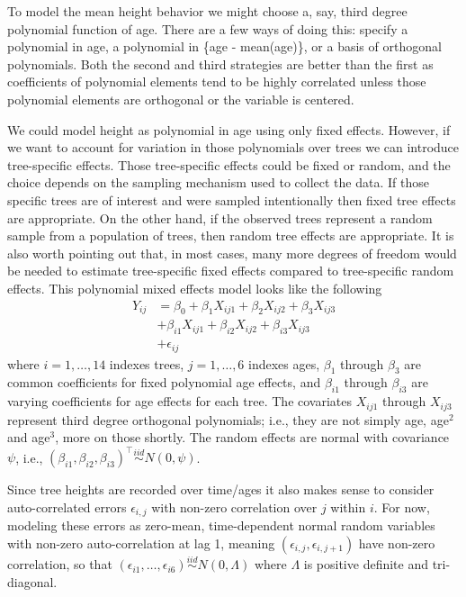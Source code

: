 \documentclass[
]{book}
\begin{document}
To model the mean height behavior we might choose a, say, third degree polynomial function of age. There are a few ways of doing this: specify a polynomial in age, a polynomial in \{age - mean(age)\}, or a basis of orthogonal polynomials. Both the second and third strategies are better than the first as coefficients of polynomial elements tend to be highly correlated unless those polynomial elements are orthogonal or the variable is centered.

We could model height as polynomial in age using only fixed effects. However, if we want to account for variation in those polynomials over trees we can introduce tree-specific effects. Those tree-specific effects could be fixed or random, and the choice depends on the sampling mechanism used to collect the data. If those specific trees are of interest and were sampled intentionally then fixed tree effects are appropriate. On the other hand, if the observed trees represent a random sample from a population of trees, then random tree effects are appropriate. It is also worth pointing out that, in most cases, many more degrees of freedom would be needed to estimate tree-specific fixed effects compared to tree-specific random effects. This polynomial mixed effects model looks like the following
\begin{align*}
Y_{ij} &= \beta_0 + \beta_1 X_{ij1}+ \beta_2 X_{ij2}+ \beta_3 X_{ij3}\\
       &+ \beta_{i1} X_{ij1}+ \beta_{i2} X_{ij2}+ \beta_{i3} X_{ij3}\\
       & + \epsilon_{ij}
\end{align*}
where \(i=1, \ldots, 14\) indexes trees, \(j = 1, \ldots, 6\) indexes ages, \(\beta_1\) through \(\beta_3\) are common coefficients for fixed polynomial age effects, and \(\beta_{i1}\) through \(\beta_{i3}\) are varying coefficients for age effects for each tree. The covariates \(X_{ij1}\) through \(X_{ij3}\) represent third degree orthogonal polynomials; i.e., they are not simply age, age\(^2\) and age\(^3\), more on those shortly. The random effects are normal with covariance \(\psi\), i.e., \((\beta_{i1},\beta_{i2},\beta_{i3})^\top \stackrel{iid}{\sim}N(0,\psi)\).

Since tree heights are recorded over time/ages it also makes sense to consider auto-correlated errors \(\epsilon_{i,j}\) with non-zero correlation over \(j\) within \(i\). For now, modeling these errors as zero-mean, time-dependent normal random variables with non-zero auto-correlation at lag 1, meaning \((\epsilon_{i,j}, \epsilon_{i,j+1})\) have non-zero correlation, so that \((\epsilon_{i1},\ldots, \epsilon_{i6})\stackrel{iid}{\sim} N(0,\Lambda)\) where \(\Lambda\) is positive definite and tri-diagonal.
\end{document}
